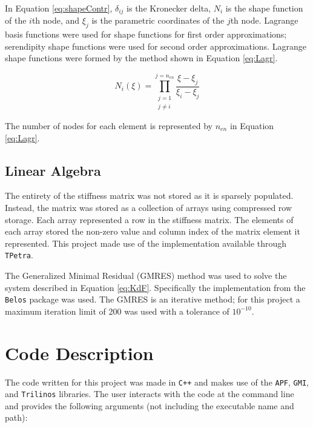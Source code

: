 \documentclass[a4paper, 12pt]{article}
\begin{document}
In Equation \ref{eq:shapeContr}, $\delta_{ij}$ is the Kronecker delta, 
$N_i$ is the shape function of the $i$th node, and $\xi_j$ is the 
parametric coordinates of the $j$th node. Lagrange basis functions
were used for shape functions for first order approximations; 
serendipity shape functions were used for second order approximations.  Lagrange shape functions were formed by the method shown in 
Equation \ref{eq:Lagr}.

\begin{equation} \label{eq:Lagr}
N_i(\xi) = 
  \prod_
  { \substack{ j =    1    \\ 
               j \neq i } }
  ^{j = n_{en}}
  \frac
  { \xi   - \xi_{j} }
  { \xi_i - \xi_{j} }
\end{equation}

The number of nodes for each element is represented by $n_{en}$ in 
Equation \ref{eq:Lagr}.

\subsection{Linear Algebra} \label{subsec:LinAlg}
The entirety of the stiffness matrix was not stored as it is 
sparsely populated. Instead, the matrix was stored as a collection
of arrays using compressed row storage. 
Each array represented a row in the stiffness matrix. 
The elements of each array stored the non-zero value and column index of the 
matrix element it represented. This project made use 
of the implementation available through \texttt{TPetra}.

The Generalized Minimal Residual (GMRES) method was used to solve 
the system described in Equation \ref{eq:KdF}. Specifically
the implementation from the \texttt{Belos} package was used.  
The GMRES is an iterative method; for this project a maximum 
iteration limit of 200 was used with a tolerance of $10^{-10}$.

\section{Code Description} \label{sec:codeDes}
The code written for this project was made in \texttt{C++} 
and makes use of the \texttt{APF}, \texttt{GMI}, and 
\texttt{Trilinos} libraries. The user interacts with
the code at the command line and provides the following
arguments (not including the executable name and path):
\end{document}
